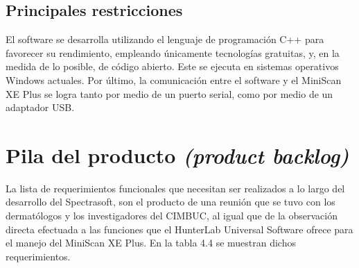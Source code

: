 	\subsection{Principales restricciones}
	
	El software se desarrolla utilizando el lenguaje de programaci\'{o}n C++ para favorecer su rendimiento, empleando \'{u}nicamente tecnolog\'{i}as gratuitas, y, en la medida de lo posible, de c\'{o}digo abierto. Este se ejecuta en sistemas operativos Windows actuales. Por \'{u}ltimo, la comunicaci\'{o}n entre el software y el MiniScan XE Plus se logra tanto por medio de un puerto serial, como por medio de un adaptador USB.
	
\section{Pila del producto \textit{(product backlog)}}
	La lista de requerimientos funcionales que necesitan ser realizados a lo largo del desarrollo del Spectrasoft, son el producto de una reuni\'{o}n que se tuvo con los dermat\'{o}logos y los investigadores del CIMBUC, al igual que de la observaci\'{o}n directa efectuada a las funciones que el HunterLab Universal Software ofrece para el manejo del MiniScan XE Plus. En la tabla 4.4 se muestran dichos requerimientos.
	
